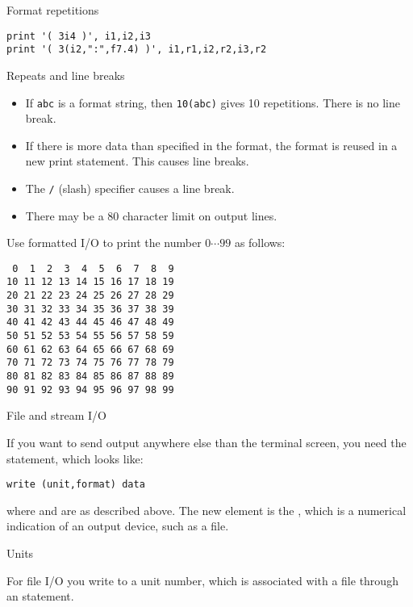\begin{block}{Format repetitions}
  \label{sl:fformat-rep}
\begin{lstlisting}
print '( 3i4 )', i1,i2,i3
print '( 3(i2,":",f7.4) )', i1,r1,i2,r2,i3,r2
\end{lstlisting}
\end{block}

\begin{block}{Repeats and line breaks}
  \label{sl:formatrepeat}
  \begin{itemize}
  \item If \lstinline{abc} is a format string, then \lstinline{10(abc)} gives 10
    repetitions. There is no line break.
  \item If there is more data than specified in the format, the format
    is reused in a new print statement. This causes line breaks.
  \item The \lstinline{/} (slash) specifier causes a line break.
  \item There may be a 80 character limit on output lines.
  \end{itemize}
\end{block}

\begin{exercise}
  \label{ex:f99}
  Use formatted I/O to print the number $0\cdots99$ as follows:
\begin{lstlisting}
 0  1  2  3  4  5  6  7  8  9
10 11 12 13 14 15 16 17 18 19
20 21 22 23 24 25 26 27 28 29
30 31 32 33 34 35 36 37 38 39
40 41 42 43 44 45 46 47 48 49
50 51 52 53 54 55 56 57 58 59
60 61 62 63 64 65 66 67 68 69
70 71 72 73 74 75 76 77 78 79
80 81 82 83 84 85 86 87 88 89
90 91 92 93 94 95 96 97 98 99
\end{lstlisting}
\end{exercise}

 {File and stream I/O}

If you want to send output anywhere else than the terminal screen, you
need the  statement, which looks like:
\begin{lstlisting}
write (unit,format) data
\end{lstlisting}
where  and  are as described above. The new element
is the , which is a numerical indication of an output
device, such as a file.

 {Units}

For file I/O you write to a unit number,
which is associated with a file through an 
statement.


